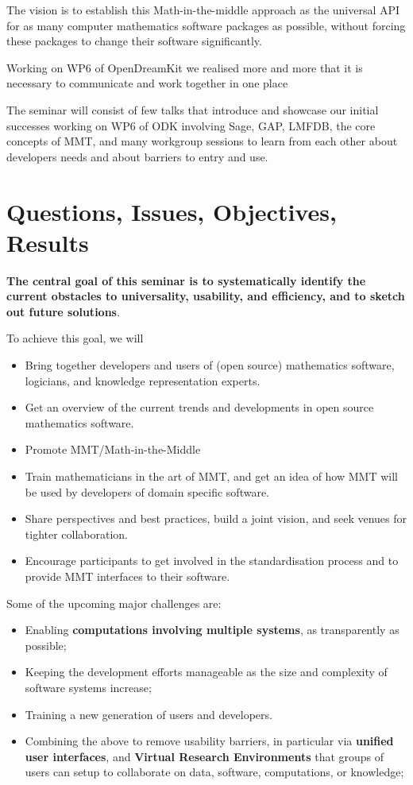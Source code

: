 The vision is to establish this Math-in-the-middle approach as the universal API
for as many computer mathematics software packages as possible, without forcing
these packages to change their software significantly.

Working on WP6 of OpenDreamKit we realised more and more that it is necessary to
communicate and work together in one place

The seminar will consist of few talks that introduce and showcase our initial
successes working on WP6 of ODK involving Sage, GAP, LMFDB, the core concepts
of MMT, and many workgroup sessions to learn from each other about developers
needs and about barriers to entry and use. 

\section{Questions, Issues, Objectives, Results}

\textbf{The central goal of this seminar is to systematically identify the
current obstacles to universality, usability, and efficiency, and
to sketch out future solutions}.

To achieve this goal, we will 
\begin{itemize}
\item Bring together developers and users of (open source) mathematics software,
  logicians, and knowledge representation experts.
\item Get an overview of the current trends and developments in open source
  mathematics software.
\item Promote MMT/Math-in-the-Middle
\item Train mathematicians in the art of MMT, and get an idea of how MMT will be
  used by developers of domain specific software.
\item Share perspectives and best practices, build a joint vision, and
  seek venues for tighter collaboration.
\item Encourage participants to get involved in the standardisation process and
  to provide MMT interfaces to their software.
\end{itemize}

Some of the upcoming major challenges are:
\begin{itemize}
\item Enabling \textbf{computations involving multiple systems},
  as transparently as possible;
\item Keeping the development efforts manageable as the size and
  complexity of software systems increase;
\item Training a new generation of users and developers.
\item Combining the above to remove usability barriers, in particular via
  \textbf{unified user interfaces}, and \textbf{Virtual Research Environments}
  that groups of users can setup to collaborate on data, software, computations,
  or knowledge;
\end{itemize}

